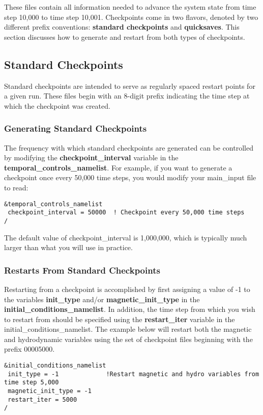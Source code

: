 These files contain all information needed to advance the system state from time step 10,000 to time step 10,001.  Checkpoints come in two flavors, denoted by two different prefix conventions:  \textbf{standard checkpoints} and \textbf{quicksaves}.  This section discusses how to generate and restart from both types of checkpoints.

\subsection{Standard Checkpoints}
Standard checkpoints are intended to serve as regularly spaced restart points for a given run.  These files begin with an 8-digit prefix indicating the time step at which the checkpoint was created.

\subsubsection{Generating Standard Checkpoints}
The frequency with which standard checkpoints are generated can be controlled by modifying the \textbf{checkpoint\_interval} variable in the \textbf{temporal\_controls\_namelist}.  For example, if you want to generate a checkpoint once every 50,000 time steps, you would modify your main\_input file to read:

\begin{lstlisting}
&temporal_controls_namelist
 checkpoint_interval = 50000  ! Checkpoint every 50,000 time steps
/
\end{lstlisting}
The default value of checkpoint\_interval is 1,000,000, which is typically much larger than what you will use in practice.

\subsubsection{Restarts From Standard Checkpoints}
Restarting from a checkpoint is accomplished by first assigning a value of -1 to the variables \textbf{init\_type} and/or \textbf{magnetic\_init\_type} in the \textbf{initial\_conditions\_namelist}.  In addition, the time step from which you wish to restart from should be specified using the \textbf{restart\_iter} variable in the initial\_conditions\_namelist.  The example below will restart both the magnetic and hydrodynamic variables using the set of checkpoint files beginning with the prefix 00005000.
\begin{lstlisting}
&initial_conditions_namelist
 init_type = -1             !Restart magnetic and hydro variables from time step 5,000
 magnetic_init_type = -1
 restart_iter = 5000
/
\end{lstlisting}

